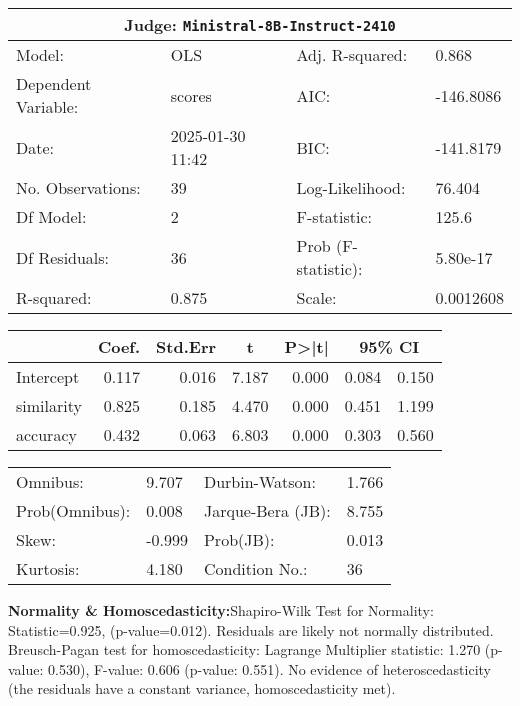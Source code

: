 \begin{center}
\small
\begin{tabular}{llll}
\toprule
\multicolumn{4}{c}{\textbf{Judge:} \texttt{Ministral-8B-Instruct-2410} \citep{mistral2024ministral8b}} \\
\midrule
Model: & OLS & Adj. R-squared: & 0.868 \\
Dependent Variable: & scores & AIC: & -146.8086 \\
Date: & 2025-01-30 11:42 & BIC: & -141.8179 \\
No. Observations: & 39 & Log-Likelihood: & 76.404 \\
Df Model: & 2 & F-statistic: & 125.6 \\
Df Residuals: & 36 & Prob (F-statistic): & 5.80e-17 \\
R-squared: & 0.875 & Scale: & 0.0012608 \\
\bottomrule
\end{tabular}

\vspace{5pt}
\begin{tabular}{lrrrrrr}
\toprule
 & \multicolumn{1}{c}{Coef.} & \multicolumn{1}{c}{Std.Err} & \multicolumn{1}{c}{t} & \multicolumn{1}{c}{P>|t|} & \multicolumn{2}{c}{95\% CI} \\
\midrule
Intercept & 0.117 & 0.016 & 7.187 & 0.000 & 0.084 & 0.150 \\
similarity & 0.825 & 0.185 & 4.470 & 0.000 & 0.451 & 1.199 \\
accuracy & 0.432 & 0.063 & 6.803 & 0.000 & 0.303 & 0.560 \\
\bottomrule
\end{tabular}

\vspace{5pt}
\begin{tabular}{@{}ll@{\hspace{15pt}}ll@{}}
\toprule
Omnibus: & 9.707 & Durbin-Watson: & 1.766 \\
Prob(Omnibus): & 0.008 & Jarque-Bera (JB): & 8.755 \\
Skew: & -0.999 & Prob(JB): & 0.013 \\
Kurtosis: & 4.180 & Condition No.: & 36 \\
\bottomrule
\end{tabular}
\end{center}

\textbf{Normality \& Homoscedasticity:}Shapiro-Wilk Test for Normality: Statistic=0.925, (p-value=0.012).
Residuals are likely not normally distributed.
Breusch-Pagan test for homoscedasticity:
Lagrange Multiplier statistic: 1.270
(p-value: 0.530), 
F-value: 0.606
(p-value: 0.551). 
No evidence of heteroscedasticity (the residuals have a constant variance, homoscedasticity met).


